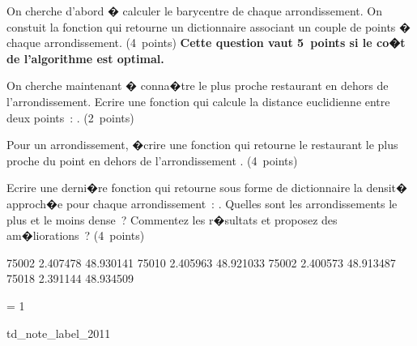 \begin{xexercicenot}
On cherche d'abord � calculer le barycentre de chaque arrondissement. On constuit la fonction  qui retourne un dictionnaire associant un couple de points � chaque arrondissement. (4~points) \textbf{Cette question vaut 5~points si le co�t de l'algorithme est optimal.}

\exequest On cherche maintenant � conna�tre le plus proche restaurant en dehors de l'arrondissement. Ecrire une fonction qui calcule la distance euclidienne entre deux points~: . (2~points)

\exequest Pour un arrondissement, �crire une fonction  qui retourne le restaurant le plus proche du point  en dehors  de l'arrondissement . (4~points)

\exequest Ecrire une derni�re fonction qui retourne sous forme de dictionnaire la densit� approch�e pour chaque arrondissement~: . Quelles sont les arrondissements le plus et le moins dense~? Commentez les r�sultats et proposez des am�liorations~? (4~points)

\begin{verbatimx}
75002    2.407478    48.930141         75010    2.405963    48.921033
75002    2.400573    48.913487         75018    2.391144    48.934509
\end{verbatimx}





\end{xexercicenot}



\ifnum\correctionenonce = 1

\begin{xdemoexonot}{td_note_label_2011}




\end{xdemoexonot}
\fi

%
